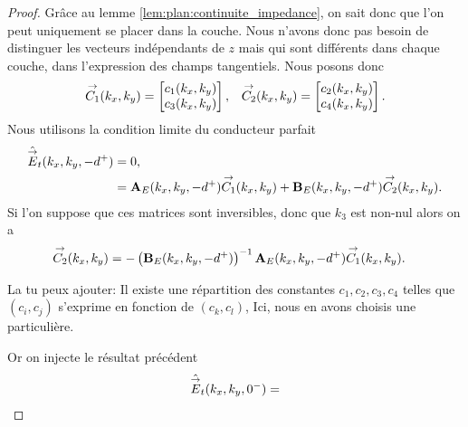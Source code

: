         \begin{proof}
            Grâce au lemme \eqref{lem:plan:continuite_impedance}, on sait donc que l'on peut uniquement se placer dans la couche. Nous n'avons donc pas besoin de distinguer les vecteurs indépendants de \(z\) mais qui sont différents dans chaque couche, dans l'expression des champs tangentiels. Nous posons donc
            \begin{align*}
                {\overset{\rightarrow}{C_1}}(k_x,k_y) = \begin{bmatrix}c_1(k_x,k_y) \\ c_3(k_x,k_y)\end{bmatrix}, 
                && 
                {\overset{\rightarrow}{C_2}}(k_x,k_y) = \begin{bmatrix}c_2(k_x,k_y) \\ c_4(k_x,k_y)\end{bmatrix}.
            \end{align*}
            Nous utilisons la condition limite du conducteur parfait
            \begin{align*}
                \hat{{\overset{\rightarrow}{E}}}_t(k_x,k_y,-d^+) &= 0,
                \\
                &=  \mathbf{A}_E(k_x,k_y,-d^+){\overset{\rightarrow}{C_1}}(k_x,k_y) + \mathbf{B}_E(k_x,k_y,-d^+){\overset{\rightarrow}{C_2}}(k_x,k_y).
            \end{align*}
            Si l’on suppose que ces matrices sont inversibles, donc que \(k_3\) est non-nul alors on a
            \begin{align*}
                {\overset{\rightarrow}{C_2}}(k_x,k_y) &= -\left(\mathbf{B}_E(k_x,k_y,-d^+)\right)^{-1}\mathbf{A}_E(k_x,k_y,-d^+){\overset{\rightarrow}{C_1}}(k_x,k_y).
            \end{align*}
            \begin{REM}
              La tu peux ajouter: Il existe une répartition des constantes \(c_1,c_2,c_3,c_4\) telles que \((c_i,c_j)\) s'exprime en fonction de \((c_k,c_l)\), Ici, nous en avons choisis une particulière.
            \end{REM}
            Or on injecte le résultat précédent
            \begin{multline*}
                \hat \vE_t(k_x,k_y,0^-) =
                \\

\end{multline*}
\end{proof}
